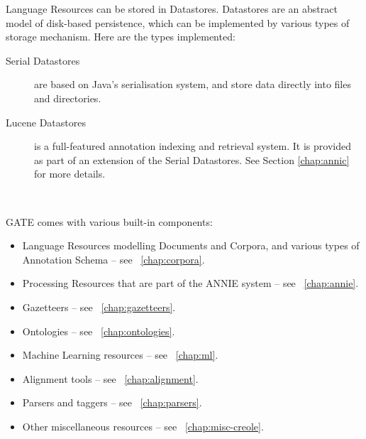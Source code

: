 Language Resources can be stored in Datastores. Datastores are an abstract
model of disk-based persistence, which can be implemented by various types of
storage mechanism. Here are the types implemented:
%
\begin{description}
%
\item[Serial Datastores] are based on Java's serialisation system, and store
data directly into files and directories.
%
\item[Lucene Datastores] is a full-featured annotation indexing and
retrieval system. It is provided as part of an extension of the Serial
Datastores. See Section \ref{chap:annic} for more details.
%
%
\end{description}


\mbox{ }

GATE comes with various built-in components:
%
\begin{itemize}
%
\item
Language Resources modelling Documents and Corpora, and various types of
Annotation Schema -- see \Chapthing\ \ref{chap:corpora}.
%
\item
Processing Resources that are part of the ANNIE system -- see \Chapthing\
\ref{chap:annie}.
%
%
\item 
Gazetteers -- see \Chapthing\
\ref{chap:gazetteers}.
\item
Ontologies -- see \Chapthing\
\ref{chap:ontologies}.
\item
Machine Learning resources -- see \Chapthing\
\ref{chap:ml}.
\item
Alignment tools -- see \Chapthing\
\ref{chap:alignment}.
\item
Parsers and taggers -- see \Chapthing\
\ref{chap:parsers}.
\item
Other miscellaneous resources -- see \Chapthing\ \ref{chap:misc-creole}.
\end{itemize}

